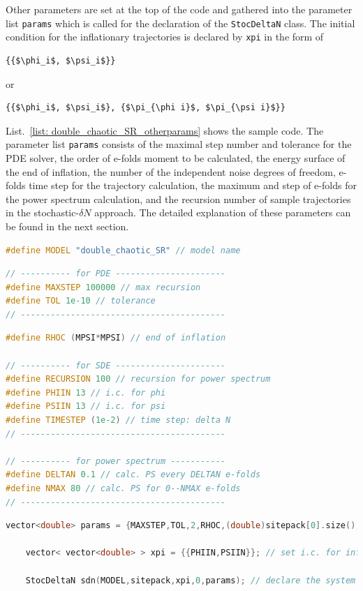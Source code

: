 \documentclass[aps, prd
, preprint
, nofootinbib 
, notitlepage
, superscriptaddress
, longbibliography
]{revtex4-1}
\begin{document}
Other parameters are set at the top of the code and gathered into the parameter list \texttt{params} which is called for the declaration of the \texttt{StocDeltaN} class. The initial condition for the inflationary trajectories is declared by \texttt{xpi} in the form of
\begin{lstlisting}[numbers = none, mathescape]
{{$\phi_i$, $\psi_i$}}    
\end{lstlisting}
or
\begin{lstlisting}[numbers = none, mathescape]
{{$\phi_i$, $\psi_i$}, {$\pi_{\phi i}$, $\pi_{\psi i}$}}
\end{lstlisting}
List.~\ref{list: double_chaotic_SR_otherparams} shows the sample code. The parameter list \texttt{params} consists of the maximal step number and tolerance for the PDE solver, the order of e-folds moment to be calculated, the energy surface of the end of inflation, the number of the independent noise degrees of freedom, e-folds time step for the trajectory calculation, the maximum and step of e-folds for the power spectrum calculation, and the recursion number of sample trajectories in the stochastic-$\delta N$ approach. The detailed explanation of these parameters can be found in the next section.

\begin{lstlisting}[language = C++, caption={\textit{sample/double\_chaotic\_SR.cpp}}, label=list: double_chaotic_SR_otherparams, firstnumber = 4]
#define MODEL "double_chaotic_SR" // model name
\end{lstlisting}
\begin{lstlisting}[language = C++, firstnumber = 15]
// ---------- for PDE ----------------------
#define MAXSTEP 100000 // max recursion
#define TOL 1e-10 // tolerance
// -----------------------------------------
\end{lstlisting}
\begin{lstlisting}[language = C++, firstnumber = 25]
#define RHOC (MPSI*MPSI) // end of inflation

// ---------- for SDE ----------------------
#define RECURSION 100 // recursion for power spectrum
#define PHIIN 13 // i.c. for phi
#define PSIIN 13 // i.c. for psi
#define TIMESTEP (1e-2) // time step: delta N
// -----------------------------------------

// ---------- for power spectrum -----------
#define DELTAN 0.1 // calc. PS every DELTAN e-folds
#define NMAX 80 // calc. PS for 0--NMAX e-folds
// -----------------------------------------
\end{lstlisting}
\begin{lstlisting}[language = C++, firstnumber = 72]
    vector<double> params = {MAXSTEP,TOL,2,RHOC,(double)sitepack[0].size(),TIMESTEP,NMAX,DELTAN,RECURSION};

    vector< vector<double> > xpi = {{PHIIN,PSIIN}}; // set i.c. for inflationary trajectories

    StocDeltaN sdn(MODEL,sitepack,xpi,0,params); // declare the system
\end{lstlisting}
\end{document}

